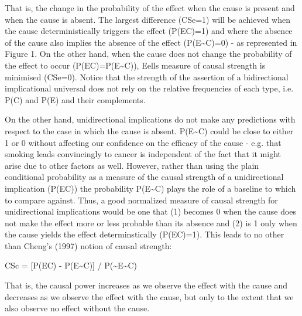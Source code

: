 \documentclass[11pt]{article}
\newenvironment{styleStandard}{\setlength\leftskip{0in}\setlength\rightskip{0in}\setlength\parindent{0in}\setlength\parfillskip{0pt plus 1fil}\setlength\parskip{0in plus 1pt}\writerlistparindent\writerlistleftskip\leavevmode\normalfont\normalsize\writerlistlabel\ignorespaces}{\unskip\vspace{0in plus 1pt}\par}
\newcommand\writerlistleftskip{}
\newcommand\writerlistparindent{}
\newcommand\writerlistlabel{}
\begin{document}
\begin{styleStandard}
That is, the change in the probability of the effect when the cause is present and when the cause is absent. The largest difference (CSe=1) will be achieved when the cause deterministically triggers the effect (P(E{\textbar}C)=1) and where the absence of the cause also implies the absence of the effect (P(E{\textbar}\~{}C)=0) - as represented in Figure 1. On the other hand, when the cause does not change the probability of the effect to occur (P(E{\textbar}C)=P(E{\textbar}\~{}C)), Eells{\textquotesingle} measure of causal strength is minimised (CSe=0). Notice that the strength of the assertion of a bidirectional implicational universal does not rely on the relative frequencies of each type, i.e. P(C) and P(E) and their complements.
\end{styleStandard}


\begin{styleStandard}
On the other hand, unidirectional implications do not make any predictions with respect to the case in which the cause is absent. P(E{\textbar}\~{}C) could be close to either 1 or 0 without affecting our confidence on the efficacy of the cause - e.g. that smoking leads convincingly to cancer is independent of the fact that it might arise due to other factors as well. However, rather than using the plain conditional probability as a measure of the causal strength of a unidirectional implication (P(E{\textbar}C)) the probability P(E{\textbar}\~{}C) plays the role of a baseline to which to compare against. Thus, a good normalized measure of causal strength for unidirectional implications would be one that (1) becomes 0 when the cause does not make the effect more or less probable than its absence and (2) is 1 only when the cause yields the effect determinstically (P(E{\textbar}C)=1). This leads to no other than Cheng’s (1997) notion of causal strength:
\end{styleStandard}


\begin{styleStandard}
CSc = [P(E{\textbar}C) - P(E{\textbar}\~{}C)] / P(\~{}E{\textbar}\~{}C)
\end{styleStandard}


\begin{styleStandard}
That is, the causal power increases as we observe the effect with the cause and decreases as we observe the effect with the cause, but only to the extent that we also observe no effect without the cause. \ 
\end{styleStandard}
\end{document}
